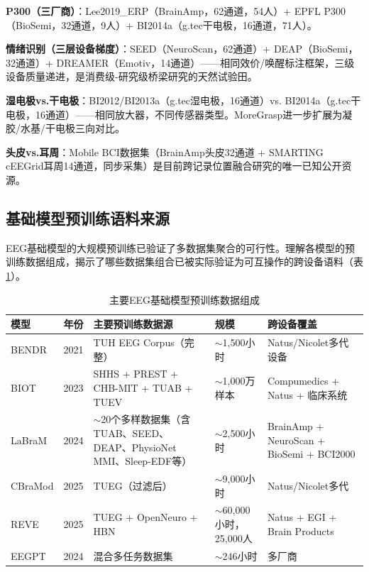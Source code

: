\documentclass[12pt, a4paper]{article}
\begin{document}
\textbf{P300（三厂商）}：Lee2019\_ERP\citep{Lee2019OpenBMI}（BrainAmp，62通道，54人）+ EPFL P300（BioSemi，32通道，9人）+ BI2014a（g.tec干电极，16通道，71人）。

\textbf{情绪识别（三层设备梯度）}：SEED\citep{Zheng2015SEED}（NeuroScan，62通道）+ DEAP\citep{Koelstra2012DEAP}（BioSemi，32通道）+ DREAMER\citep{DREAMER2018}（Emotiv，14通道）——相同效价/唤醒标注框架，三级设备质量递进，是消费级-研究级桥梁研究的天然试验田。

\textbf{湿电极vs.干电极}：BI2012/BI2013a（g.tec湿电极，16通道）vs. BI2014a（g.tec干电极，16通道）——相同放大器，不同传感器类型。MoreGrasp\citep{Schwarz2020MoreGrasp}进一步扩展为凝胶/水基/干电极三向对比。

\textbf{头皮vs.耳周}：Mobile BCI数据集\citep{MobileBCI2021}（BrainAmp头皮32通道 + SMARTING cEEGrid耳周14通道，同步采集）是目前跨记录位置融合研究的唯一已知公开资源。

\subsection{基础模型预训练语料来源}
\label{sec:pretrain_corpora}

EEG基础模型的大规模预训练已验证了多数据集聚合的可行性。理解各模型的预训练数据组成，揭示了哪些数据集组合已被实际验证为可互操作的跨设备语料（表\ref{tab:pretrain}）。

\begin{table}[H]
\centering
\caption{主要EEG基础模型预训练数据组成}
\label{tab:pretrain}
\small
\begin{tabularx}{\textwidth}{p{1.8cm}p{0.8cm}Xp{1.8cm}X}
\toprule
\textbf{模型} & \textbf{年份} & \textbf{主要预训练数据源} & \textbf{规模} & \textbf{跨设备覆盖} \\
\midrule
BENDR \citep{Kostas2021BENDR} & 2021 & TUH EEG Corpus（完整） & $\sim$1,500小时 & Natus/Nicolet多代设备 \\
\addlinespace
BIOT \citep{Yang2023BIOT} & 2023 & SHHS + PREST + CHB-MIT + TUAB + TUEV & $\sim$1,000万样本 & Compumedics + Natus + 临床系统 \\
\addlinespace
LaBraM \citep{Jiang2024LaBraM} & 2024 & $\sim$20个多样数据集（含TUAB、SEED、DEAP、PhysioNet MMI、Sleep-EDF等） & $\sim$2,500小时 & BrainAmp + NeuroScan + BioSemi + BCI2000 \\
\addlinespace
CBraMod \citep{Wang2025CBraMod} & 2025 & TUEG（过滤后） & $\sim$9,000小时 & Natus/Nicolet多代 \\
\addlinespace
REVE \citep{ElOuahidi2025REVE} & 2025 & TUEG + OpenNeuro + HBN & $\sim$60,000小时，25,000人 & Natus + EGI + Brain Products \\
\addlinespace
EEGPT \citep{EEGPT2024} & 2024 & 混合多任务数据集 & $\sim$246小时 & 多厂商 \\
\bottomrule
\end{tabularx}
\end{table}
\end{document}
